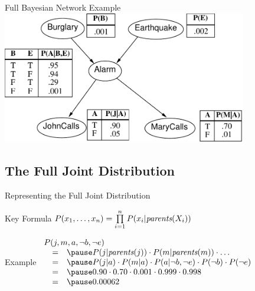 \documentclass[12pt]{beamer}
\newcommand{\EM}[1]{\mbox{\em#1}}
\begin{document}
\begin{frame}{Full Bayesian Network Example}
	\includegraphics[width=4.2in]{burglary_network}
\end{frame}


\subsection{The Full Joint Distribution}
\begin{frame}{Representing the Full Joint Distribution}
	\begin{block}{Key Formula}
		$P(x_{1},\ldots,x_{n}) = \prod\limits_{i=1}^{n}{P(x_{i}|\EM{parents}(X_{i}))}$
	\end{block}
	\begin{block}{Example}
		$
		\begin{array}{lll}
			\lefteqn{P(j, m, a, \lnot b, \lnot e)}
			\\
			& = & \pause
			      P(j|\EM{parents}(j)) \cdot
			      P(m|\EM{parents}(m)) \cdot
			      \ldots
			\\
			& = & \pause
			      P(j|a) \cdot
			      P(m|a) \cdot
			      P(a|\lnot b, \lnot e) \cdot
			      P(\lnot b) \cdot
			      P(\lnot e)
			\\
			& = & \pause
			      0.90 \cdot
			      0.70 \cdot
			      0.001 \cdot
			      0.999 \cdot
			      0.998
			\\
			& = & \pause
			      0.00062
		\end{array}
		$
	\end{block}
\end{frame}
\end{document}
